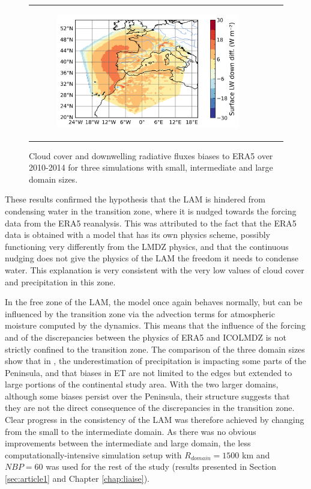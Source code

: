\begin{figure}[htbp]
\begin{tabular}{ccc}
\begin{subfigure}[b]{0.33\textwidth}
            \includegraphics[width=\textwidth]{images/chap4/domain_size/diff_map_LWdnSFC_era_LAM_2000km_NBP80.png}
        \end{subfigure}
    \end{tabular}
    \caption{Cloud cover and downwelling radiative fluxes biases to ERA5 over 2010-2014 for three simulations with small, intermediate and large domain sizes.}
    \label{fig:domain_size_clouds_ERA_diff_maps}
\end{figure}

These results confirmed the hypothesis that the LAM is hindered from condensing water in the transition zone, where it is nudged towards the forcing data from the ERA5 reanalysis. This was attributed to the fact that the ERA5 data is obtained with a model that has its own physics scheme, possibly functioning very differently from the LMDZ physics, and that the continuous nudging does not give the physics of the LAM the freedom it needs to condense water. This explanation is very consistent with the very low values of cloud cover and precipitation in this zone.

In the free zone of the LAM, the model once again behaves normally, but can be influenced by the transition zone via the advection terms for atmospheric moisture computed by the dynamics. This means that the influence of the forcing and of the discrepancies between the physics of ERA5 and ICOLMDZ is not strictly confined to the transition zone.
The comparison of the three domain sizes show that in \smalld, the underestimation of precipitation is impacting some parts of the Peninsula, and that biases in ET are not limited to the edges but extended to large portions of the continental study area. With the two larger domains, although some biases persist over the Peninsula, their structure suggests that they are not the direct consequence of the discrepancies in the transition zone. Clear progress in the consistency of the LAM was therefore achieved by changing from the small to the intermediate domain. As there was no obvious improvements between the intermediate and large domain, the less computationally-intensive \interd simulation setup with $R_{domain} = 1500$ km and $NBP = 60$ was used for the rest of the study (results presented in Section \ref{sec:article1} and Chapter \ref{chap:liaise}).

